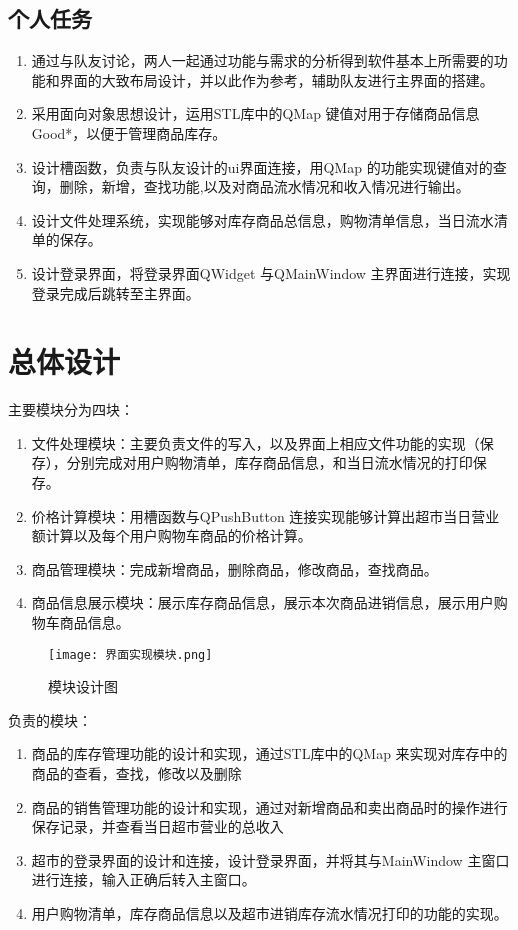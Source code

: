 \documentclass[
   projtype=report, %
   output=print,     %
  ]{nwafuprojrep}
\begin{document}
\subsection{个人任务}
\begin{enumerate}
	\item 通过与队友讨论，两人一起通过功能与需求的分析得到软件基本上所需要的功能和界面的大致布局设计，并以此作为参考，辅助队友进行主界面的搭建。
	\item 采用面向对象思想设计，运用STL库中的QMap 键值对用于存储商品信息Good*，以便于管理商品库存。
	\item 设计槽函数，负责与队友设计的ui界面连接，用QMap 的功能实现键值对的查询，删除，新增，查找功能,以及对商品流水情况和收入情况进行输出。
	\item 设计文件处理系统，实现能够对库存商品总信息，购物清单信息，当日流水清单的保存。
	\item 设计登录界面，将登录界面QWidget 与QMainWindow 主界面进行连接，实现登录完成后跳转至主界面。 
\end{enumerate}
\section{总体设计}
主要模块分为四块：
\begin{enumerate}
	\item 文件处理模块：主要负责文件的写入，以及界面上相应文件功能的实现（保存），分别完成对用户购物清单，库存商品信息，和当日流水情况的打印保存。
	\item 价格计算模块：用槽函数与QPushButton 连接实现能够计算出超市当日营业额计算以及每个用户购物车商品的价格计算。
	\item 商品管理模块：完成新增商品，删除商品，修改商品，查找商品。
	\item 商品信息展示模块：展示库存商品信息，展示本次商品进销信息，展示用户购物车商品信息。
\end{enumerate}
\begin{figure}[htbp]
\centering
\texttt{[image: 界面实现模块.png]}
\caption[模块设计]{模块设计图}\label{fig-jiemian}
\end{figure}
负责的模块：
\begin{enumerate}
	\item 商品的库存管理功能的设计和实现，通过STL库中的QMap 来实现对库存中的 商品的查看，查找，修改以及删除
	\item 商品的销售管理功能的设计和实现，通过对新增商品和卖出商品时的操作进行保存记录，并查看当日超市营业的总收入
	\item 超市的登录界面的设计和连接，设计登录界面，并将其与MainWindow 主窗口进行连接，输入正确后转入主窗口。
	\item 用户购物清单，库存商品信息以及超市进销库存流水情况打印的功能的实现。
\end{enumerate}
\end{document}
